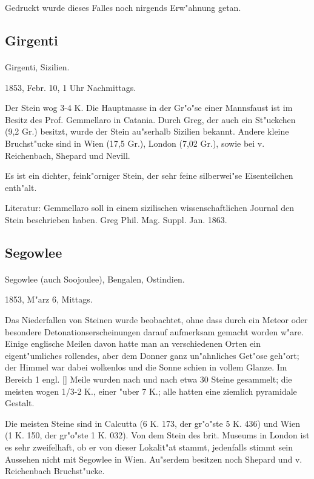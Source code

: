 \documentclass[a4paper, 11pt, oneside]{article}
\begin{document}
Gedruckt wurde dieses Falles noch nirgends Erw"ahnung getan.

\subsection{Girgenti}
\normalsize
\paragraph{}
Girgenti, Sizilien.

1853, Febr. 10, 1 Uhr Nachmittags.

Der Stein wog 3-4 K. Die Hauptmasse in der Gr"o"se einer Mannsfaust ist im Besitz des Prof. Gemmellaro in Catania. Durch Greg, der auch ein St"uckchen (9,2 Gr.) besitzt, wurde der Stein au"serhalb Sizilien bekannt. Andere kleine Bruchst"ucke sind in Wien (17,5 Gr.), London (7,02 Gr.), sowie bei v. Reichenbach, Shepard und Nevill.

Es ist ein dichter, feink"orniger Stein, der sehr feine silberwei"se Eisenteilchen enth"alt.

\footnotesize
Literatur: Gemmellaro soll in einem sizilischen wissenschaftlichen Journal den Stein beschrieben haben. Greg Phil. Mag. Suppl. Jan. 1863.

\subsection{Segowlee}
\normalsize
\paragraph{}
Segowlee (auch Soojoulee), Bengalen, Ostindien.

1853, M"arz 6, Mittags.

Das Niederfallen von Steinen wurde beobachtet, ohne dass durch ein Meteor oder besondere Detonationserscheinungen darauf aufmerksam gemacht worden w"are. Einige englische Meilen davon hatte man an verschiedenen Orten ein eigent"umliches rollendes, aber dem Donner ganz un"ahnliches Get"ose geh"ort; der Himmel war dabei wolkenlos und die Sonne schien in vollem Glanze. Im Bereich 1 engl. [] Meile wurden nach und nach etwa 30 Steine gesammelt; die meisten wogen 1/3-2 K., einer "uber 7 K.; alle hatten eine ziemlich pyramidale Gestalt.

Die meisten Steine sind in Calcutta (6 K. 173, der gr"o"ste 5 K. 436) und Wien (1 K. 150, der gr"o"ste 1 K. 032). Von dem Stein des brit. Museums in London ist es sehr zweifelhaft, ob er von dieser Lokalit"at stammt, jedenfalls stimmt sein Aussehen nicht mit Segowlee in Wien. Au"serdem besitzen noch Shepard und v. Reichenbach Bruchst"ucke.
\end{document}

